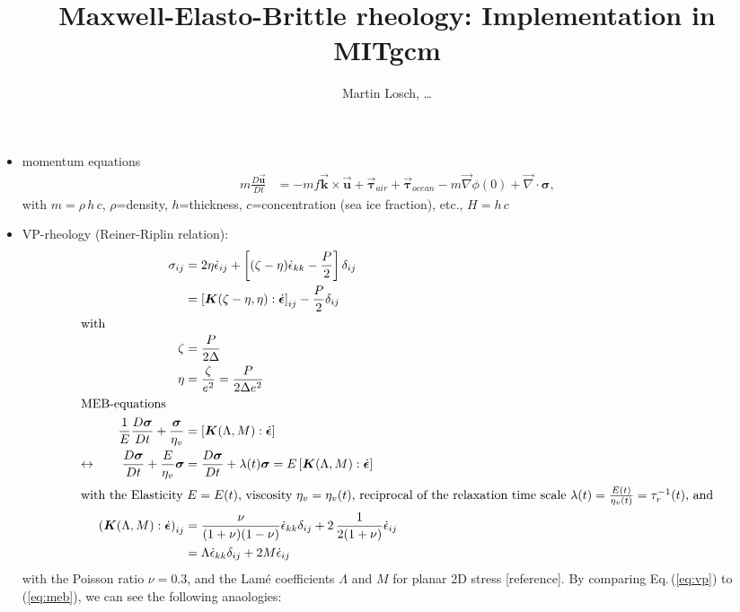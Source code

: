 \documentclass[12pt]{article}
\title{Maxwell-Elasto-Brittle rheology: Implementation in MITgcm}
\author{Martin Losch, \ldots}
\newcommand{\vek}[1]{\ensuremath{\vec{\bm{#1}}}}
\newcommand{\vtau}{\vek{\bm{\tau}}}
\newcommand{\sr}{\dot{\epsilon}}
\newcommand{\srb}{\dot{\bm{\epsilon}}}
\begin{document}
\maketitle

\begin{itemize}
\item momentum equations
  \begin{align}
  \label{eq:momseaice}
  m \frac{D\vek{u}}{Dt} &= -mf\vek{k}\times\vek{u} + \vtau_{air} +
  \vtau_{ocean} - m \vec{\nabla}{\phi(0)} + \vec{\nabla}\cdot\bm{\sigma},
  \end{align}
  with $m=\rho\,h\,c$, $\rho$=density, $h$=thickness, $c$=concentration (sea ice fraction), etc., $H=h\,c$
\item VP-rheology (Reiner-Riplin relation):
  \begin{align}
    \label{eq:vp}\sigma_{ij} &= 2 \eta \sr_{ij} +\left[(\zeta-\eta)\sr_{kk}-\frac{P}{2}\right]\delta_{ij}\\
                             &= \left[\bm{K}(\zeta-\eta,\eta):\srb
                               \right]_{ij} - \frac{P}{2}\delta_{ij}\\
    \intertext{with}
    \zeta &= \frac{P}{2\Delta} \\
    \eta &= \frac{\zeta}{e^2} = \frac{P}{2\Delta e^2} \\
    \intertext{MEB-equations}
    \frac{1}{E}\frac{D\bm{\sigma}}{Dt} + \frac{\bm{\sigma}}{\eta_{v}}
                &= \left[\bm{K}(\Lambda,M):\srb\right] \\
    \leftrightarrow \qquad
    \frac{D\bm{\sigma}}{Dt} + \frac{E}{\eta_{v}}\bm{\sigma}
                &= \frac{D\bm{\sigma}}{Dt} + \lambda(t)\bm{\sigma}
                  = E\left[\bm{K}(\Lambda,M):\srb\right] \\
    \intertext{with the Elasticity $E=E(t)$, viscosity $\eta_{v}=\eta_{v}(t)$, reciprocal of the relaxation time scale $\lambda(t)=\frac{E(t)}{\eta_{v}(t)} = \tau_r^{-1}(t)$, and}
    \label{eq:meb}\left(\bm{K}(\Lambda,M):\srb\right)_{ij}
                &= \frac{\nu}{(1+\nu)(1-\nu)}\sr_{kk}\delta_{ij}
                  + 2\,\frac{1}{2(1+\nu)}\sr_{ij} \\
                & = \Lambda\sr_{kk}\delta_{ij} +
                  2M\sr_{ij} \\
  \end{align}
  with the Poisson ratio $\nu = 0.3$, and the Lam{\'e} coefficients $\Lambda$ and $M$ for planar 2D stress [reference]. By comparing Eq.\,(\ref{eq:vp}) to (\ref{eq:meb}), we can see the following anaologies:

\end{itemize}
\end{document}
